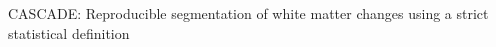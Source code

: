CASCADE: Reproducible segmentation of white matter changes using a strict statistical definition
    
  